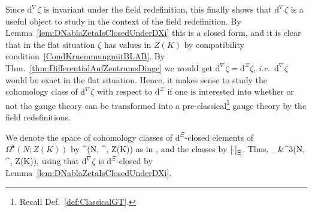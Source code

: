 \documentclass[preprint]{elsarticle}
\def\ba#1\ea{\begin{align}#1\end{align}}
\def\bas#1\eas{\begin{align*}#1\end{align*}}
\theoremstyle{plain}
\theoremstyle{remark}
\newtheorem{remark}[theorem]{Remarks}
\theoremstyle{definition}
\begin{document}
Since $\mathrm{d}^\nabla \zeta$ is invariant under the field redefinition,
%
%
%
%
this finally shows that $\mathrm{d}^\nabla \zeta$ is a useful object to study in the context of the field redefinition. By Lemma~\ref{lem:DNablaZetaIsClosedUnderDXi} this is a closed form, and it is clear that in the flat situation $\zeta$ has values in $Z(K)$ by compatibility condition~\eqref{CondKruemmungmitBLAB}. By Thm.~\ref{thm:DifferentialAufZentrumsDinge} we would get $\mathrm{d}^\nabla \zeta = \mathrm{d}^\Xi \zeta$, \textit{i.e.}~$\mathrm{d}^\nabla \zeta$ would be exact in the flat situation. Hence, it makes sense to study the cohomology class of $\mathrm{d}^\nabla \zeta$ with respect to $\mathrm{d}^\Xi$ if one is interested into whether or not the gauge theory can be transformed into a pre-classical\footnote{Recall Def.~\ref{def:ClassicalGT}.} gauge theory by the field redefinitions.

We denote the space of cohomology classes of $\mathrm{d}^\Xi$-closed elements of $\Omega^\bullet(N; Z(K))$ by
\ba
\mathcal{H}^\bullet\mleft(N, ^\Xi, Z(K)\mright)
\ea
as in \cite[Theorem 7.2.12, replace $A$ with $\mathrm{T}N$ and $\rho^\Xi$ with $\mathrm{d}^\Xi$; page 277]{mackenzieGeneralTheory}, and the classes by $\mleft[ \cdot \mright]_\Xi$. Thus,
\bas
\mleft[ \mathrm{d}^\nabla \zeta \mright]_\Xi &\in {}^3\mleft(N, ^\Xi, Z(K)\mright),
\eas
using that $\mathrm{d}^\nabla \zeta$ is $\mathrm{d}^\Xi$-closed by Lemma~\ref{lem:DNablaZetaIsClosedUnderDXi}.
\end{document}
